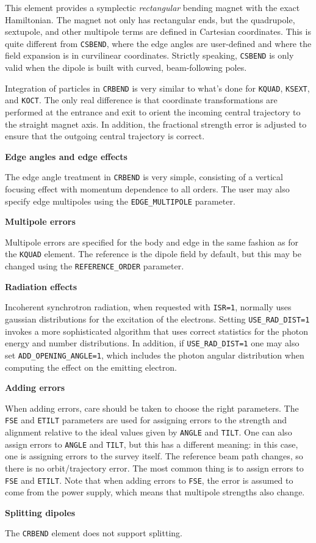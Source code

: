 This element provides a symplectic {\em rectangular} bending magnet with the exact
Hamiltonian.  The magnet not only has rectangular ends, but the
quadrupole, sextupole, and other multipole terms are defined in Cartesian coordinates.
This is quite different from \verb|CSBEND|, where the edge angles are user-defined and
where the field expansion is in curvilinear coordinates.
Strictly speaking, \verb|CSBEND| is only valid when the dipole is built with curved,
beam-following poles.

Integration of particles in \verb|CRBEND| is very similar to what's done for
\verb|KQUAD|, \verb|KSEXT|, and \verb|KOCT|. 
The only real difference is that coordinate transformations are performed at the
entrance and exit to orient the incoming central trajectory to the straight magnet axis.
In addition, the fractional strength error is adjusted to ensure that the 
outgoing central trajectory is correct.

{\bf Edge angles and edge effects} 

The edge angle treatment in \verb|CRBEND| is very simple, consisting of a 
vertical focusing effect with momentum dependence to all orders.
The user may also specify edge multipoles using the \verb|EDGE_MULTIPOLE| parameter.

{\bf Multipole errors}

Multipole errors are specified for the body and edge in the same fashion as for the
\verb|KQUAD| element.
The reference is the dipole field by default, but this may be changed using the
\verb|REFERENCE_ORDER| parameter.

{\bf Radiation effects}

Incoherent synchrotron radiation, when requested with {\tt ISR=1},
normally uses gaussian distributions for the excitation of the electrons.
Setting {\tt USE\_RAD\_DIST=1} invokes a more sophisticated algorithm that
uses correct statistics for the photon energy and number distributions.
In addition, if {\tt USE\_RAD\_DIST=1} one may also set {\tt ADD\_OPENING\_ANGLE=1},
which includes the photon angular distribution when computing the effect on 
the emitting electron.  

{\bf Adding errors}

When adding errors, care should be taken to choose the right
parameters.  The \verb|FSE| and \verb|ETILT| parameters are used for
assigning errors to the strength and alignment relative to the ideal
values given by \verb|ANGLE| and \verb|TILT|.  One can also assign 
errors to \verb|ANGLE| and \verb|TILT|, but this has a different meaning:
in this case, one is assigning errors to the survey itself.  The reference
beam path changes, so there is no orbit/trajectory error. The most common
thing is to assign errors to \verb|FSE| and \verb|ETILT|.  Note that when
adding errors to \verb|FSE|, the error is assumed to come from the power
supply, which means that multipole strengths also change.

{\bf Splitting dipoles}

The \verb|CRBEND| element does not support splitting.

